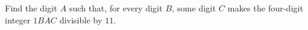 Find the digit $A$ such that, for every digit $B$, some digit $C$ makes the four-digit integer $\overline{1BAC}$ divisible by $11$.
